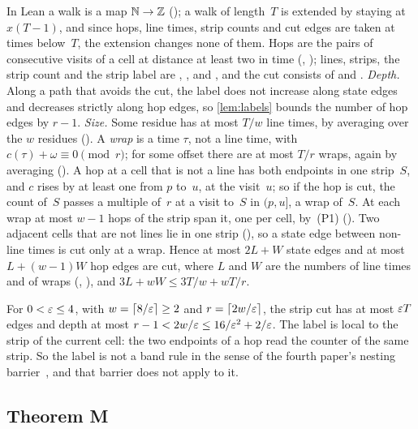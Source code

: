 \begin{outline}
In Lean a walk is a map $\mathbb{N}\to\mathbb{Z}$ (); a walk of length~$T$ is extended by staying at $x(T-1)$, and since
hops, line times, strip counts and cut edges are taken at times below~$T$, the extension changes none of them. Hops are
the pairs of consecutive visits of a cell at distance at least two in time (, );
lines, strips, the strip count and the strip label are , ,  and
, and the cut consists of  and . \emph{Depth.} Along a path that avoids the
cut, the label does not increase along state edges and decreases strictly along hop edges, so \cref{lem:labels} bounds the
number of hop edges by $r-1$. \emph{Size.} Some residue has at most $T/w$ line times, by averaging over the $w$ residues
(). A \emph{wrap} is a time $\tau$, not a line time, with $c(\tau)+\omega\equiv0\pmod r$; for
some offset there are at most $T/r$ wraps, again by averaging (). A hop at a cell that is not a line has
both endpoints in one strip~$S$, and $c$ rises by at least one from $p$ to~$u$, at the visit~$u$; so if the hop is cut, the
count of~$S$ passes a multiple of~$r$ at a visit to~$S$ in $(p,u]$, a wrap of~$S$. At each wrap at most $w-1$ hops of
the strip span it, one per cell, by~(P1) (). Two adjacent cells that are not lines lie in one strip
(), so a state edge between non-line times is cut only at a wrap. Hence at most $2L+W$ state edges
and at most $L+(w-1)W$ hop edges are cut, where $L$ and $W$ are the numbers of line times and of wraps
(, ), and $3L+wW\le3T/w+wT/r$.
\end{outline}

For $0<\varepsilon\le4$, with $w=\lceil8/\varepsilon\rceil\ge2$ and $r=\lceil2w/\varepsilon\rceil$, the strip cut has at most $\varepsilon T$ edges
and depth at most $r-1<2w/\varepsilon\le16/\varepsilon^2+2/\varepsilon$. The label is local to the strip of the current cell: the two endpoints of a hop read
the counter of the same strip. So the label is not a band rule in the sense of the fourth paper's nesting
barrier~\cite[Definition~5.5]{FourthPaper2026}, and that barrier does not apply to it.

\subsection{Theorem M}\label{sec:one-M}

